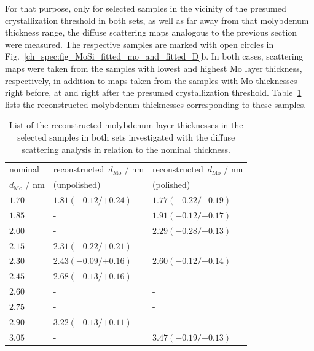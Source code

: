 For that purpose, only for selected samples in the vicinity of the presumed crystallization threshold in both sets, as well as far away from that molybdenum thickness range, the diffuse scattering maps analogous to the previous section were measured. The respective samples are marked with open circles in Fig.~\ref{ch_spec:fig_MoSi_fitted_mo_and_fitted_D}b. In both cases, scattering maps were taken from the samples with lowest and highest Mo layer thickness, respectively, in addition to maps taken from the samples with Mo thicknesses right before, at and right after the presumed crystallization threshold. Table~\ref{ch_diff:tbl_mo_si_thickness_mcmc_result_selected_samples} lists the reconstructed molybdenum thicknesses corresponding to these samples.
\begin{table}[htbp]
\centering
\caption{List of the reconstructed molybdenum layer thicknesses in the selected samples in both sets investigated with the diffuse scattering analysis in relation to the nominal thickness.}
\label{ch_diff:tbl_mo_si_thickness_mcmc_result_selected_samples}
\begin{tabular}{@{}lll@{}}
\toprule
nominal &reconstructed~$d_\text{Mo}$ / nm&reconstructed~$d_\text{Mo}$ / nm\\ 
$d_\text{Mo}$ / nm&(unpolished) & (polished) \\
\midrule
$1.70$ &$1.81({-0.12}/{+0.24})$  &$1.77({-0.22}/{+0.19})$ \\
$1.85$ &-  &$1.91({-0.12}/{+0.17})$ \\
$2.00$ &-  &$2.29({-0.28}/{+0.13})$ \\
$2.15$ &$2.31({-0.22}/{+0.21})$  &- \\
$2.30$ &$2.43({-0.09}/{+0.16})$   &$2.60({-0.12}/{+0.14})$ \\
$2.45$ &$2.68({-0.13}/{+0.16})$  &- \\
$2.60$ &- &- \\
$2.75$ &-  &- \\
$2.90$ &$3.22({-0.13}/{+0.11})$ &- \\
$3.05$ &-  & $3.47({-0.19}/{+0.13})$ \\
 \bottomrule
\end{tabular}
\end{table}


